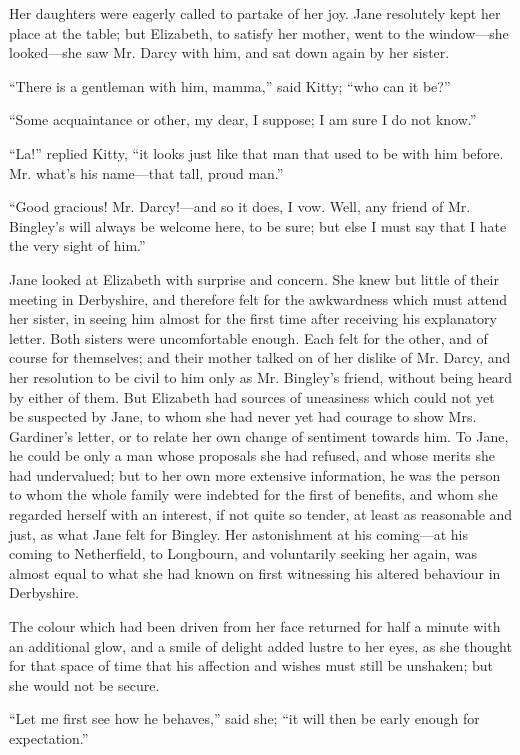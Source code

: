 \documentclass[12pt,openright]{book}
\begin{document}
Her daughters were eagerly called to partake of her joy. Jane resolutely kept her place at the table; but Elizabeth, to satisfy her mother, went to the window—she looked—she saw Mr. Darcy with him, and sat down again by her sister.

“There is a gentleman with him, mamma,” said Kitty; “who can it be?”

“Some acquaintance or other, my dear, I suppose; I am sure I do not know.”

“La!” replied Kitty, “it looks just like that man that used to be with him before. Mr. what’s his name—that tall, proud man.”

“Good gracious! Mr. Darcy!—and so it does, I vow. Well, any friend of Mr. Bingley’s will always be welcome here, to be sure; but else I must say that I hate the very sight of him.”

Jane looked at Elizabeth with surprise and concern. She knew but little of their meeting in Derbyshire, and therefore felt for the awkwardness which must attend her sister, in seeing him almost for the first time after receiving his explanatory letter. Both sisters were uncomfortable enough. Each felt for the other, and of course for themselves; and their mother talked on of her dislike of Mr. Darcy, and her resolution to be civil to him only as Mr. Bingley’s friend, without being heard by either of them. But Elizabeth had sources of uneasiness which could not yet be suspected by Jane, to whom she had never yet had courage to show Mrs. Gardiner’s letter, or to relate her own change of sentiment towards him. To Jane, he could be only a man whose proposals she had refused, and whose merits she had undervalued; but to her own more extensive information, he was the person to whom the whole family were indebted for the first of benefits, and whom she regarded herself with an interest, if not quite so tender, at least as reasonable and just, as what Jane felt for Bingley. Her astonishment at his coming—at his coming to Netherfield, to Longbourn, and voluntarily seeking her again, was almost equal to what she had known on first witnessing his altered behaviour in Derbyshire.

The colour which had been driven from her face returned for half a minute with an additional glow, and a smile of delight added lustre to her eyes, as she thought for that space of time that his affection and wishes must still be unshaken; but she would not be secure.

“Let me first see how he behaves,” said she; “it will then be early enough for expectation.”
\end{document}
